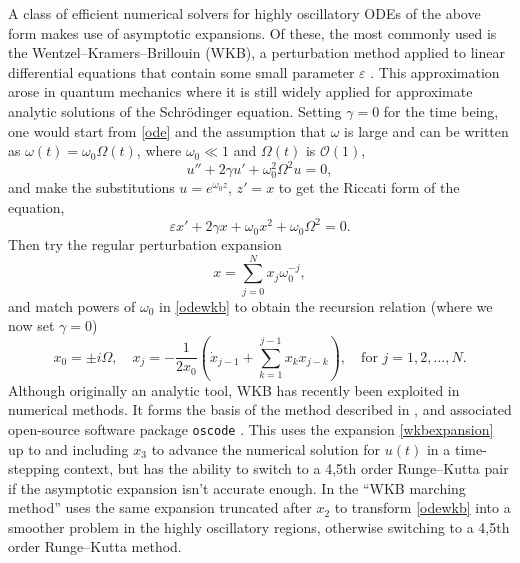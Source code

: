 \documentclass[10pt]{article}
\newcommand{\be}{\begin{equation}}
\newcommand{\ee}{\end{equation}}
\newcommand{\bigO}{{\mathcal O}}
\newcommand{\om}{\omega}
\newcommand{\g}{\gamma}
\begin{document}
A class of efficient numerical solvers for highly oscillatory ODEs of the
above form makes use of asymptotic expansions. 
Of these, the most commonly used is the Wentzel--Kramers--Brillouin (WKB), a
perturbation method applied to linear differential equations that contain some
small parameter $\varepsilon$ \cite{logan,benderorszag}.
This approximation arose in quantum mechanics where it is still widely
applied for approximate analytic solutions of the Schr\"{o}dinger equation.
Setting $\g = 0$ for
the time being, one would start from \cref{ode} and the assumption that $\om$ is large and can be written as $\om(t) = \om_0\Omega(t)$, where $\om_0 \ll 1$ and $\Omega(t)$ is $\bigO(1)$,
\be\label{odewkb}
u'' + 2\gamma u' + \om_0^2 \Omega^2 u = 0,
\ee
and make the substitutions $u = e^{\om_0 z}$, $z' = x$ to get the Riccati form of the equation,
\be\label{riccwkb}
\varepsilon x' + 2\gamma x + \om_0 x^2 + \om_0 \Omega^2 = 0.
\ee
Then try the regular perturbation expansion
\be\label{wkbexpansion}
x = \sum_{j=0}^{N} x_j\om_0^{-j},
\ee
and match powers of $\om_0$ in \cref{odewkb} to obtain the recursion relation (where we now set $\gamma = 0$)
\begin{equation}\label{wkbrecur}
    x_0 = \pm i\Omega, \quad x_j = -\frac{1}{2x_0}\left( \dot{x}_{j-1} + \sum_{k = 1}^{j-1}x_k x_{j-k} \right), \quad \text{for } j = 1, 2, \ldots, N.
\end{equation}
Although originally an analytic tool,
WKB has recently been exploited in numerical methods.  %
It forms the basis of the method described in
\cite{agocs2020efficient,agocs2020dense}, and associated open-source software
package \texttt{oscode} \cite{agocs2020joss}. This uses the expansion
\cref{wkbexpansion} up to and including $x_3$ to advance the numerical solution
for $u(t)$ in a time-stepping context, but has the ability to switch to a 4,5th
order Runge--Kutta pair if the asymptotic expansion isn't accurate enough. 
In \cite{arnold2011wkb,korner2022wkb} the ``WKB marching method'' uses the same
expansion truncated after $x_2$ to transform \cref{odewkb} into a smoother
problem in the highly oscillatory regions, otherwise switching to a 4,5th order
Runge--Kutta method.
\end{document}

